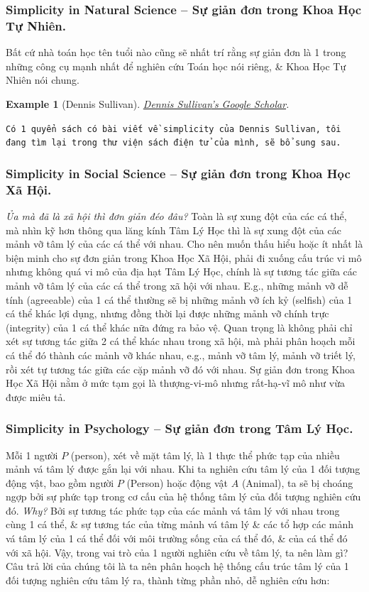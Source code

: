 \documentclass[12pt,oneside]{book}
\newtheorem{example}{Example}
\begin{document}
\subsubsection{Simplicity in Natural Science -- Sự giản đơn trong Khoa Học Tự Nhiên.} Bất cứ nhà toán học tên tuổi nào cũng sẽ nhất trí rằng sự giản đơn là 1 trong những công cụ mạnh nhất để nghiên cứu Toán học nói riêng, \& Khoa Học Tự Nhiên nói chung.

\begin{example}[{\sc Dennis Sullivan}]
	\href{https://scholar.google.com/citations?user=0l0z5wgAAAAJ&hl=en}{{\sc Dennis Sullivan}'s Google Scholar}.
\end{example}
{\tt Có 1 quyển sách có bài viết về simplicity của {\sc Dennis Sullivan}, tôi đang tìm lại trong thư viện sách điện tử của mình, sẽ bổ sung sau.}

\subsubsection{Simplicity in Social Science -- Sự giản đơn trong Khoa Học Xã Hội.}
{\it Ủa mà đã là xã hội thì đơn giản đéo đâu?} Toàn là sự xung đột của các cá thể, mà nhìn kỹ hơn thông qua lăng kính Tâm Lý Học thì là sự xung đột của các mảnh vỡ tâm lý của các cá thể với nhau. Cho nên muốn thấu hiểu hoặc ít nhất là biện minh cho sự đơn giản trong Khoa Học Xã Hội, phải đi xuống cấu trúc vi mô nhưng không quá vi mô của địa hạt Tâm Lý Học, chính là sự tương tác giữa các mảnh vỡ tâm lý của các cá thể trong xã hội với nhau. E.g., những mảnh vỡ dễ tính (agreeable) của 1 cá thể thường sẽ bị những mảnh vỡ ích kỷ (selfish) của 1 cá thể khác lợi dụng, nhưng đồng thời lại được những mảnh vỡ chính trực (integrity) của 1 cá thể khác nữa đứng ra bảo vệ. Quan trọng là không phải chỉ xét sự tương tác giữa 2 cá thể khác nhau trong xã hội, mà phải phân hoạch mỗi cá thể đó thành các mảnh vỡ khác nhau, e.g., mảnh vỡ tâm lý, mảnh vỡ triết lý, rồi xét tự tương tác giữa các cặp mảnh vỡ đó với nhau. Sự giản đơn trong Khoa Học Xã Hội nằm ở mức tạm gọi là thượng-vi-mô nhưng rất-hạ-vĩ mô như vừa được miêu tả.

\subsubsection{Simplicity in Psychology -- Sự giản đơn trong Tâm Lý Học.} Mỗi 1 người $P$ (person), xét về mặt tâm lý, là 1 thực thể phức tạp của nhiều mảnh vá tâm lý được gắn lại với nhau. Khi ta nghiên cứu tâm lý của 1 đối tượng động vật, bao gồm người $P$ (Person) hoặc động vật $A$ (Animal), ta sẽ bị choáng ngợp bởi sự phức tạp trong cơ cấu của hệ thống tâm lý của đối tượng nghiên cứu đó. {\it Why?} Bởi sự tương tác phức tạp của các mảnh vá tâm lý với nhau trong cùng 1 cá thể, \& sự tương tác của từng mảnh vá tâm lý \& các tổ hợp các mảnh vá tâm lý của 1 cá thể đối với môi trường sống của cá thể đó, \& của cá thể đó với xã hội. Vậy, trong vai trò của 1 người nghiên cứu về tâm lý, ta nên làm gì? Câu trả lời của chúng tôi là ta nên phân hoạch hệ thống cấu trúc tâm lý của 1 đối tượng nghiên cứu tâm lý ra, thành từng phần nhỏ, dễ nghiên cứu hơn: 
\end{document}

